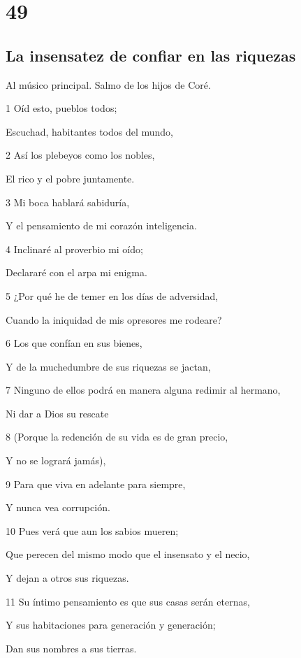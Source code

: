 \chapter{49}

\section*{La insensatez de confiar en las riquezas}

\par Al músico principal. Salmo de los hijos de Coré.

\par 1 Oíd esto, pueblos todos;
\par Escuchad, habitantes todos del mundo,
\par 2 Así los plebeyos como los nobles,
\par El rico y el pobre juntamente.
\par 3 Mi boca hablará sabiduría,
\par Y el pensamiento de mi corazón inteligencia.
\par 4 Inclinaré al proverbio mi oído;
\par Declararé con el arpa mi enigma.
\par 5 ¿Por qué he de temer en los días de adversidad,
\par Cuando la iniquidad de mis opresores me rodeare?
\par 6 Los que confían en sus bienes,
\par Y de la muchedumbre de sus riquezas se jactan,
\par 7 Ninguno de ellos podrá en manera alguna redimir al hermano,
\par Ni dar a Dios su rescate
\par 8 (Porque la redención de su vida es de gran precio,
\par Y no se logrará jamás),
\par 9 Para que viva en adelante para siempre,
\par Y nunca vea corrupción.
\par 10 Pues verá que aun los sabios mueren;
\par Que perecen del mismo modo que el insensato y el necio,
\par Y dejan a otros sus riquezas.
\par 11 Su íntimo pensamiento es que sus casas serán eternas,
\par Y sus habitaciones para generación y generación;
\par Dan sus nombres a sus tierras.
